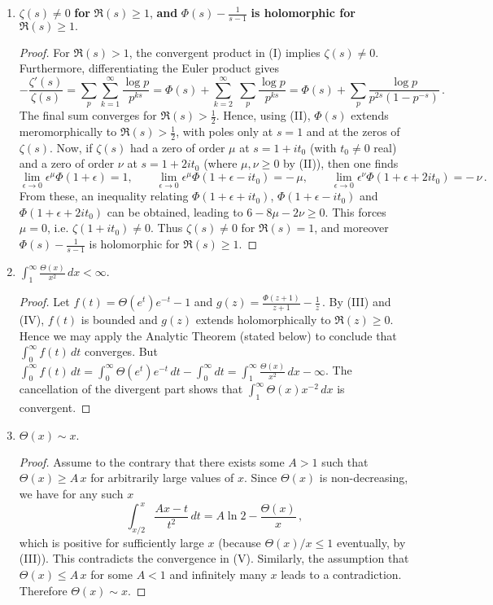 \documentclass{article}
\begin{document}
\begin{enumerate}
\item $\displaystyle \zeta(s)\neq0$ \textbf{for} $\Re(s)\ge 1$, \textbf{and} $\Phi(s) - \frac{1}{s-1}$ \textbf{is holomorphic for} $\Re(s)\ge 1.$ 
\begin{proof}
For $\Re(s)>1$, the convergent product in (I) implies $\zeta(s)\neq0$. Furthermore, differentiating the Euler product gives 
\[
-\frac{\zeta'(s)}{\zeta(s)} = \sum_{p}\sum_{k=1}^\infty \frac{\log p}{p^{ks}} = \Phi(s) + \sum_{k=2}^{\infty}\;\sum_{p}\frac{\log p}{p^{ks}} = \Phi(s) + \sum_{p}\frac{\log p}{p^{2s}(1-p^{-s})}\,. 
\] 
The final sum converges for $\Re(s)>\frac{1}{2}$. Hence, using (II), $\Phi(s)$ extends meromorphically to $\Re(s)>\frac{1}{2}$, with poles only at $s=1$ and at the zeros of $\zeta(s)$. Now, if $\zeta(s)$ had a zero of order $\mu$ at $s=1+it_0$ (with $t_0\neq 0$ real) and a zero of order $\nu$ at $s=1+2it_0$ (where $\mu,\nu\ge0$ by (II)), then one finds 
\[
\lim_{\epsilon\to 0}\epsilon^{\mu}\Phi(1+\epsilon) = 1,\qquad 
\lim_{\epsilon\to 0}\epsilon^{\mu}\Phi(1+\epsilon-it_0) = -\,\mu,\qquad 
\lim_{\epsilon\to 0}\epsilon^{\nu}\Phi(1+\epsilon+2it_0) = -\,\nu\,.
\] 
From these, an inequality relating $\Phi(1+\epsilon+it_0)$, $\Phi(1+\epsilon-it_0)$ and $\Phi(1+\epsilon+2it_0)$ can be obtained, leading to $6 - 8\mu - 2\nu \ge 0$. This forces $\mu=0$, i.e. $\zeta(1+it_0)\neq0$. Thus $\zeta(s)\neq0$ for $\Re(s)=1$, and moreover $\Phi(s)-\frac{1}{s-1}$ is holomorphic for $\Re(s)\ge 1$. 
\end{proof}

\item $\displaystyle \int_{1}^{\infty}\frac{\Theta(x)}{x^2}\,dx < \infty.$
\begin{proof}
Let $f(t)=\Theta(e^t)e^{-t}-1$ and $g(z)=\frac{\Phi(z+1)}{\,z+1\,}-\frac{1}{z}\,. $ By (III) and (IV), $f(t)$ is bounded and $g(z)$ extends holomorphically to $\Re(z)\ge 0$. Hence we may apply the Analytic Theorem (stated below) to conclude that $\int_{0}^{\infty}f(t)\,dt$ converges. But $\int_{0}^{\infty}f(t)\,dt = \int_{0}^{\infty}\Theta(e^t)e^{-t}\,dt - \int_{0}^{\infty}dt = \int_{1}^{\infty}\frac{\Theta(x)}{x^2}\,dx - \infty$. The cancellation of the divergent part shows that $\int_{1}^{\infty} \Theta(x)x^{-2}\,dx$ is convergent.
\end{proof}

\item $\displaystyle \Theta(x)\sim x.$ 
\begin{proof}
Assume to the contrary that there exists some $A>1$ such that $\Theta(x)\ge A\,x$ for arbitrarily large values of $x$. Since $\Theta(x)$ is non-decreasing, we have for any such $x$ 
\[
\int_{x/2}^{\,x}\frac{A x - t}{t^2}\,dt = A\ln 2 - \frac{\Theta(x)}{x}\,,
\] 
which is positive for sufficiently large $x$ (because $\Theta(x)/x \le 1$ eventually, by (III)). This contradicts the convergence in (V). Similarly, the assumption that $\Theta(x)\le A\,x$ for some $A<1$ and infinitely many $x$ leads to a contradiction. Therefore $\Theta(x)\sim x$. 
\end{proof}
\end{enumerate}
\end{document}

